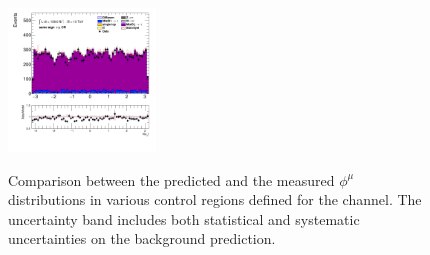 \begin{figure}[!htp]
\begin{center}
			\includegraphics[width=0.35\textwidth]{chapters/chapter6_HPlus/images/taulep/mu_0_phi_SS_TAUMU.png} \\
			\end{center}
			\caption{
			Comparison between the predicted and the measured $\phi^{\mu}$ distributions in various control regions defined for the \taulep channel. The uncertainty band includes both statistical and systematic uncertainties on the background prediction. 
			}
			\label{fig:bkg-phi-mu-taulep}
		\end{figure}

